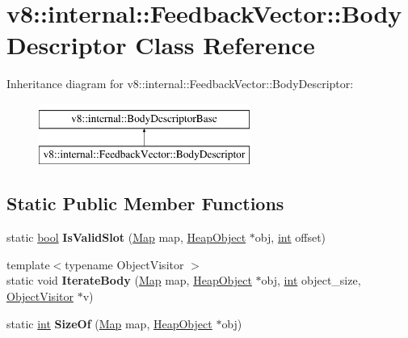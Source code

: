 \hypertarget{classv8_1_1internal_1_1FeedbackVector_1_1BodyDescriptor}{}\section{v8\+:\+:internal\+:\+:Feedback\+Vector\+:\+:Body\+Descriptor Class Reference}
\label{classv8_1_1internal_1_1FeedbackVector_1_1BodyDescriptor}
Inheritance diagram for v8\+:\+:internal\+:\+:Feedback\+Vector\+:\+:Body\+Descriptor\+:\begin{figure}[H]
\begin{center}
\leavevmode
\includegraphics[height=2.000000cm]{classv8_1_1internal_1_1FeedbackVector_1_1BodyDescriptor}
\end{center}
\end{figure}
\subsection*{Static Public Member Functions}
\begin{DoxyCompactItemize}
\item 
\mbox{\label{classv8_1_1internal_1_1FeedbackVector_1_1BodyDescriptor_abbbc7c9743bf5f8adc155364807b2728}} 
static \mbox{\hyperlink{classbool}{bool}} {\bfseries Is\+Valid\+Slot} (\mbox{\hyperlink{classv8_1_1internal_1_1Map}{Map}} map, \mbox{\hyperlink{classv8_1_1internal_1_1HeapObject}{Heap\+Object}} $\ast$obj, \mbox{\hyperlink{classint}{int}} offset)
\item 
\mbox{\label{classv8_1_1internal_1_1FeedbackVector_1_1BodyDescriptor_a3f92c11ffe64cf6195a534b4d6b46839}} 
{\footnotesize template$<$typename Object\+Visitor $>$ }\\static void {\bfseries Iterate\+Body} (\mbox{\hyperlink{classv8_1_1internal_1_1Map}{Map}} map, \mbox{\hyperlink{classv8_1_1internal_1_1HeapObject}{Heap\+Object}} $\ast$obj, \mbox{\hyperlink{classint}{int}} object\+\_\+size, \mbox{\hyperlink{classv8_1_1internal_1_1ObjectVisitor}{Object\+Visitor}} $\ast$v)
\item 
\mbox{\label{classv8_1_1internal_1_1FeedbackVector_1_1BodyDescriptor_a4b29dc328416cd7815bed01f4c9cf6f8}} 
static \mbox{\hyperlink{classint}{int}} {\bfseries Size\+Of} (\mbox{\hyperlink{classv8_1_1internal_1_1Map}{Map}} map, \mbox{\hyperlink{classv8_1_1internal_1_1HeapObject}{Heap\+Object}} $\ast$obj)
\end{DoxyCompactItemize}
